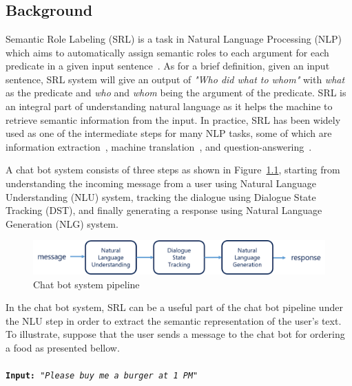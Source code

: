 \chapter{\babSatu}


\section{Background}
	
Semantic Role Labeling (SRL) is a task in Natural Language Processing (NLP) which aims to automatically assign semantic roles to each argument for each predicate in a given input sentence~\citep{jurafsky2016speech}. As for a brief definition, given an input sentence, SRL system will give an output of \textit{"Who did what to whom"} with \textit{what} as the predicate and \textit{who} and \textit{whom} being the argument of the predicate. SRL is an integral part of understanding natural language as it helps the machine to retrieve semantic information from the input. In practice, SRL has been widely used as one of the intermediate steps for many NLP tasks, some of which are information extraction~\citep{emanuele2013textual, surdeanu2003using}, machine translation~\citep{liu2010semantic, lo2013improving}, and question-answering~\citep{shen2007using, moschitti2003open}.

A chat bot system consists of three steps as shown in Figure~\ref{fig:botpipeline}, starting from understanding the incoming message from a user using Natural Language Understanding (NLU) system, tracking the dialogue using Dialogue State Tracking (DST), and finally generating a response using Natural Language Generation (NLG) system.

\begin{figure}
	\centering
	\includegraphics[width=1.0\linewidth]{images/botpipeline2}
	\caption{Chat bot system pipeline}
	\label{fig:botpipeline}
\end{figure}

In the chat bot system, SRL can be a useful part of the chat bot pipeline under the NLU step in order to extract the semantic representation of the user's text. To illustrate, suppose that the user sends a message to the chat bot for ordering a food as presented bellow.
\\
\\
\texttt{\textbf{Input:} 
	\textit{"Please buy me a burger at 1 PM"}}
\\

